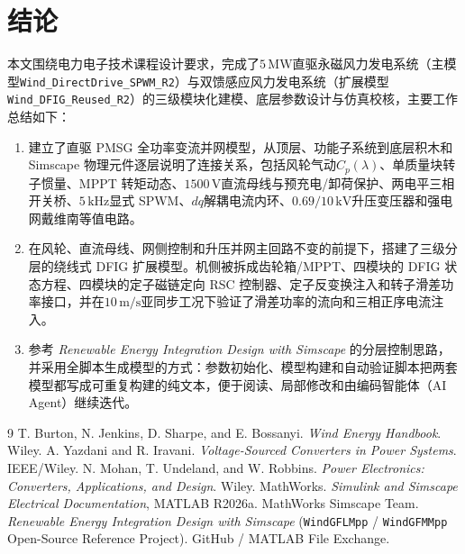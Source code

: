 \documentclass[UTF8,zihao=-4,fontset=none]{ctexrep}
\newcommand{\modelname}{\texttt{Wind\_DirectDrive\_SPWM\_R2}}
\newcommand{\dfigmodelname}{\texttt{Wind\_DFIG\_Reused\_R2}}
\begin{document}
\chapter{结论}
本文围绕电力电子技术课程设计要求，完成了\(5\,\mathrm{MW}\)直驱永磁风力发电系统（主模型\modelname）与双馈感应风力发电系统（扩展模型\dfigmodelname）的三级模块化建模、底层参数设计与仿真校核，主要工作总结如下：
\begin{enumerate}
  \item 建立了直驱 PMSG 全功率变流并网模型，从顶层、功能子系统到底层积木和 Simscape 物理元件逐层说明了连接关系，包括风轮气动\(C_p(\lambda)\)、单质量块转子惯量、MPPT 转矩动态、\(1500\,\mathrm{V}\)直流母线与预充电/卸荷保护、两电平三相开关桥、\(5\,\mathrm{kHz}\)显式 SPWM、\(dq\)解耦电流内环、\(0.69/10\,\mathrm{kV}\)升压变压器和强电网戴维南等值电路。
  \item 在风轮、直流母线、网侧控制和升压并网主回路不变的前提下，搭建了三级分层的绕线式 DFIG 扩展模型。机侧被拆成齿轮箱/MPPT、四模块的 DFIG 状态方程、四模块的定子磁链定向 RSC 控制器、定子反变换注入和转子滑差功率接口，并在\(10\,\mathrm{m/s}\)亚同步工况下验证了滑差功率的流向和三相正序电流注入。
  \item 参考 \textit{Renewable Energy Integration Design with Simscape} 的分层控制思路，并采用全脚本生成模型的方式：参数初始化、模型构建和自动验证脚本把两套模型都写成可重复构建的纯文本，便于阅读、局部修改和由编码智能体（AI Agent）继续迭代。
\end{enumerate}

\begin{thebibliography}{9}
 T. Burton, N. Jenkins, D. Sharpe, and E. Bossanyi. \textit{Wind Energy Handbook}. Wiley.
 A. Yazdani and R. Iravani. \textit{Voltage-Sourced Converters in Power Systems}. IEEE/Wiley.
 N. Mohan, T. Undeland, and W. Robbins. \textit{Power Electronics: Converters, Applications, and Design}. Wiley.
 MathWorks. \textit{Simulink and Simscape Electrical Documentation}, MATLAB R2026a.
 MathWorks Simscape Team. \textit{Renewable Energy Integration Design with Simscape} (\texttt{WindGFLMpp} / \texttt{WindGFMMpp} Open-Source Reference Project). GitHub / MATLAB File Exchange.
\end{thebibliography}

\appendix
\end{document}
